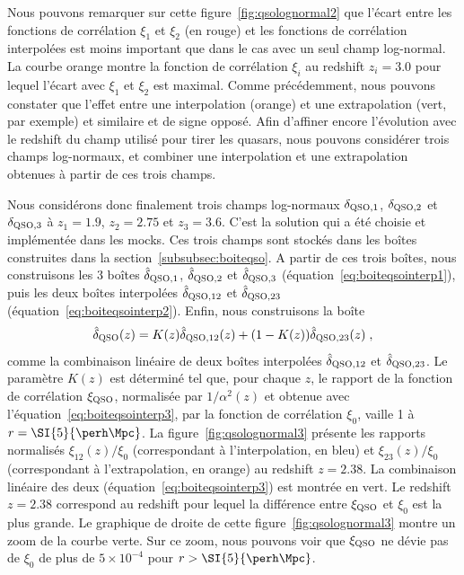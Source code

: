 Nous pouvons remarquer sur cette figure~\ref{fig:qsolognormal2} que l'écart entre les fonctions de corrélation $\xi_1$ et $\xi_2$ (en rouge) et les fonctions de corrélation interpolées est moins important que dans le cas avec un seul champ log-normal. La courbe orange montre la fonction de corrélation $\xi_i$ au redshift $z_i = \num{3.0}$ pour lequel l'écart avec $\xi_1$ et $\xi_2$ est maximal.
Comme précédemment, nous pouvons constater que l'effet entre une interpolation (orange) et une extrapolation (vert, par exemple) et similaire et de signe opposé. Afin d'affiner encore l'évolution avec le redshift du champ utilisé pour tirer les quasars, nous pouvons considérer trois champs log-normaux, et combiner une interpolation et une extrapolation obtenues à partir de ces trois champs.

Nous considérons donc finalement trois champs log-normaux $\delta_{\textsc{QSO},1}$, $\delta_{\textsc{QSO},2}$ et $\delta_{\textsc{QSO},3}$  à $z_1 = \num{1.9}$,  $z_2 = \num{2.75}$  et $z_3 = \num{3.6}$. C'est la solution qui a été choisie et implémentée dans les mocks. Ces trois champs sont stockés dans les boîtes construites dans la section~\ref{subsubsec:boiteqso}. A partir de ces trois boîtes, nous construisons les 3 boîtes $\hat \delta_{\textsc{QSO},1}$, $\hat \delta_{\textsc{QSO},2}$ et $\hat \delta_{\textsc{QSO},3}$ (équation~\ref{eq:boiteqsointerp1}), puis les deux boîtes interpolées $\hat \delta_{\textsc{QSO},12}$ et $\hat \delta_{\textsc{QSO},23}$ (équation~\ref{eq:boiteqsointerp2}). Enfin, nous construisons la boîte
\begin{equation}
  \label{eq:boiteqsointerp3}
  \hat \delta_{\textsc{QSO}}(z) = K(z) \hat \delta_{\textsc{QSO}, 12}(z) + (1 - K(z)) \hat \delta_{\textsc{QSO}, 23}(z) \; ,
\end{equation}
comme la combinaison linéaire de deux boîtes interpolées $\hat \delta_{\textsc{QSO},12}$ et $\hat \delta_{\textsc{QSO},23}$. Le paramètre $K(z)$ est déterminé tel que, pour chaque $z$, le rapport de la fonction de corrélation $\xi_{\textsc{QSO}}$, normalisée par $1/\alpha^2(z)$ et obtenue avec l'équation~\ref{eq:boiteqsointerp3}, par la fonction de corrélation $\xi_0$, vaille 1 à $r = \SI{5}{\perh\Mpc}$. La figure~\ref{fig:qsolognormal3} présente les rapports normalisés $\xi_{12}(z) / \xi_0$ (correspondant à l'interpolation, en bleu) et $\xi_{23}(z) / \xi_0$ (correspondant à l'extrapolation, en orange) au redshift $z = \num{2.38}$. La combinaison linéaire des deux (équation~\ref{eq:boiteqsointerp3}) est montrée en vert. Le redshift $z = \num{2.38}$ correspond au redshift pour lequel la différence entre $\xi_{\textsc{QSO}}$ et $\xi_0$ est la plus grande. Le graphique de droite de cette figure~\ref{fig:qsolognormal3} montre un zoom de la courbe verte. Sur ce zoom, nous pouvons voir que $\xi_{\textsc{QSO}}$ ne dévie pas de $\xi_0$ de plus de $5\times 10^{-4}$ pour $r > \SI{5}{\perh\Mpc}$.

